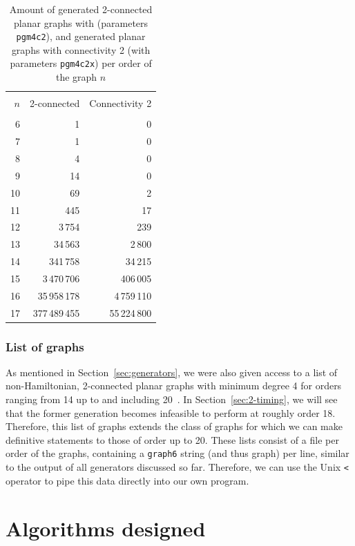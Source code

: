 \begin{table}
  \centering
  \caption{Amount of generated 2-connected planar graphs with (parameters \texttt{pgm4c2}), and generated planar graphs with connectivity 2 (with parameters \texttt{pgm4c2x}) per order of the graph $n$}
  \label{tab:2con-planar-m4}
  \begin{tabular}{rrr}
    \hline\\
    $n$ & 2-connected & Connectivity 2 \\
    \hline \\
    6 & 1 & 0 \\
    7 & 1 & 0 \\
    8	& 4 & 0 \\
    9	& 14 & 0 \\
    10 & 69 & 2 \\
    11 & 445 & 17 \\
    12 & 3\,754 & 239 \\
    13 & 34\,563 & 2\,800 \\
    14 & 341\,758 & 34\,215 \\
    15 & 3\,470\,706 & 406\,005 \\
    16 & 35\,958\,178 & 4\,759\,110 \\
    17 & 377\,489\,455 & 55\,224\,800 \\
    \hline
  \end{tabular}
\end{table}

\subsubsection{List of graphs}

As mentioned in Section~\ref{sec:generators}, we were also given access to a list of non-Hamiltonian, 2-connected planar graphs with minimum degree 4 for orders ranging from 14 up to and including 20~\cite{article:hamiltonian-planar}. In Section~\ref{sec:2-timing}, we will see that the former generation becomes infeasible to perform at roughly order 18. Therefore, this list of graphs extends the class of graphs for which we can make definitive statements to those of order up to 20. These lists consist of a file per order of the graphs, containing a \texttt{graph6} string (and thus graph) per line, similar to the output of all generators discussed so far. Therefore, we can use the Unix \texttt{<} operator to pipe this data directly into our own program. 

\section{Algorithms designed}
\label{sec:algorithms}


